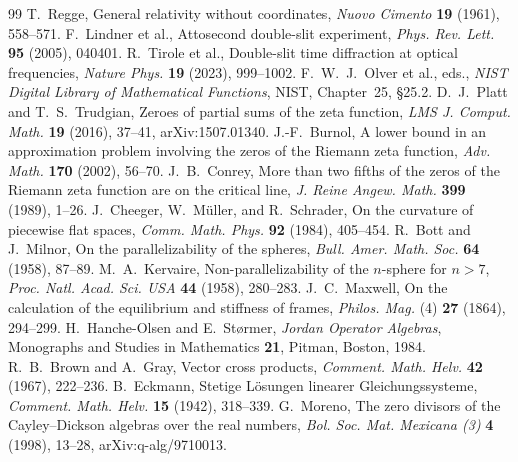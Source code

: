 \documentclass[11pt,reqno]{amsart}
\theoremstyle{definition}
\theoremstyle{remark}
\numberwithin{equation}{section}
\begin{document}
\begin{thebibliography}{99}
 T.~Regge, General relativity without coordinates, \emph{Nuovo Cimento} \textbf{19} (1961), 558--571.
 F.~Lindner et al., Attosecond double-slit experiment, \emph{Phys. Rev. Lett.} \textbf{95} (2005), 040401.
 R.~Tirole et al., Double-slit time diffraction at optical frequencies, \emph{Nature Phys.} \textbf{19} (2023), 999--1002.
 F.~W.~J.~Olver et al., eds., \emph{NIST Digital Library of Mathematical Functions}, NIST, Chapter~25, \S25.2.
 D.~J.~Platt and T.~S.~Trudgian, Zeroes of partial sums of the zeta function, \emph{LMS J. Comput. Math.} \textbf{19} (2016), 37--41, arXiv:1507.01340.
 J.-F.~Burnol, A lower bound in an approximation problem involving the zeros of the Riemann zeta function, \emph{Adv. Math.} \textbf{170} (2002), 56--70.
 J.~B.~Conrey, More than two fifths of the zeros of the Riemann zeta function are on the critical line, \emph{J. Reine Angew. Math.} \textbf{399} (1989), 1--26.
 J.~Cheeger, W.~M\"uller, and R.~Schrader, On the curvature of piecewise flat spaces, \emph{Comm. Math. Phys.} \textbf{92} (1984), 405--454.
 R.~Bott and J.~Milnor, On the parallelizability of the spheres, \emph{Bull. Amer. Math. Soc.} \textbf{64} (1958), 87--89.
 M.~A.~Kervaire, Non-parallelizability of the $n$-sphere for $n>7$, \emph{Proc. Natl. Acad. Sci. USA} \textbf{44} (1958), 280--283.
 J.~C.~Maxwell, On the calculation of the equilibrium and stiffness of frames, \emph{Philos. Mag.} (4) \textbf{27} (1864), 294--299.
 H.~Hanche-Olsen and E.~St{\o}rmer, \emph{Jordan Operator Algebras}, Monographs and Studies in Mathematics \textbf{21}, Pitman, Boston, 1984.
 R.~B.~Brown and A.~Gray, Vector cross products, \emph{Comment. Math. Helv.} \textbf{42} (1967), 222--236.
 B.~Eckmann, Stetige L\"osungen linearer Gleichungssysteme, \emph{Comment. Math. Helv.} \textbf{15} (1942), 318--339.
 G.~Moreno, The zero divisors of the Cayley--Dickson algebras over the real numbers, \emph{Bol. Soc. Mat. Mexicana (3)} \textbf{4} (1998), 13--28, arXiv:q-alg/9710013.
\end{thebibliography}
\end{document}

